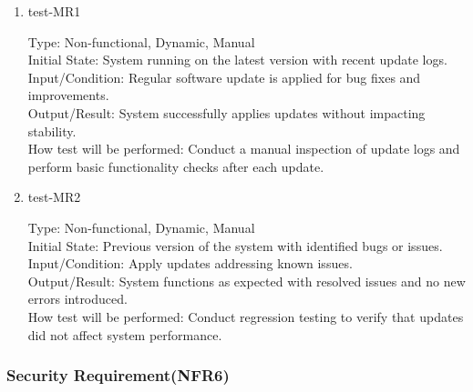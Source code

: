 \documentclass[12pt, titlepage]{article}
\begin{document}
\begin{enumerate}
    \item{test-MR1\\} \label{test-MR1}
    
    Type: Non-functional, Dynamic, Manual\\
    
    Initial State: System running on the latest version with recent update logs.\\
    
    Input/Condition: Regular software update is applied for bug fixes and improvements.\\
    
    Output/Result: System successfully applies updates without impacting stability.\\
    
    How test will be performed: Conduct a manual inspection of update logs and perform basic functionality checks after each update.

    \item{test-MR2\\} \label{test-MR2}
    
    Type: Non-functional, Dynamic, Manual\\

    Initial State: Previous version of the system with identified bugs or issues.\\

    Input/Condition: Apply updates addressing known issues.\\

    Output/Result: System functions as expected with resolved issues and no new errors introduced.\\

    How test will be performed: Conduct regression testing to verify that updates did not affect system performance.
\end{enumerate}

\subsubsection{Security Requirement(NFR6)} \label{section:4.2.6}
\end{document}
